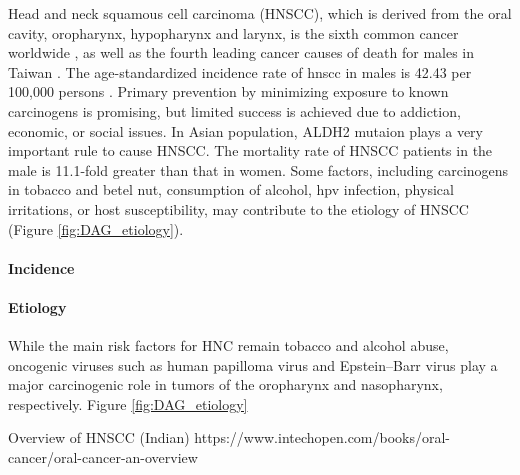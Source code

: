 \documentclass[12pt, a4paper]{article}
\begin{document}
Head and neck squamous cell carcinoma (HNSCC), which is derived from the oral cavity, oropharynx, hypopharynx and larynx, is the sixth common cancer worldwide \citep{Siegel2016}, as well as the fourth leading cancer causes of death for males in Taiwan  \citep{MOHW_death2017}. The age-standardized incidence rate of \acrshort{hnscc} in males is 42.43 per 100,000 persons \citep{MOHW_incidence2018}. 
 Primary prevention by minimizing exposure to known carcinogens is promising, but limited success is achieved due to addiction, economic, or social issues.
 In Asian population, ALDH2 mutaion plays a very important rule to cause HNSCC.
The mortality rate of HNSCC patients in the male is 11.1-fold greater than that in women.
Some factors, including carcinogens in tobacco and betel nut, consumption of alcohol, \acrfull{hpv} infection, physical irritations, or host susceptibility, may contribute to the etiology of HNSCC \citep{Ko1995,Znaori2003} (Figure \ref{fig:DAG_etiology}).



\paragraph{Incidence}

\paragraph{Etiology}
While the main risk factors for HNC remain tobacco and alcohol abuse, oncogenic viruses such as human papilloma virus and Epstein–Barr virus play a major carcinogenic role in tumors of the oropharynx and nasopharynx, respectively.\citep{Ferrarotto2017}
Figure \ref{fig:DAG_etiology}





Overview of HNSCC (Indian)
https://www.intechopen.com/books/oral-cancer/oral-cancer-an-overview
\end{document}
